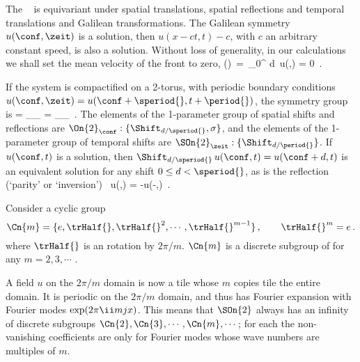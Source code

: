 


The \KSe\  is equivariant under spatial translations, spatial
reflections and temporal translations and Galilean transformations.
The Galilean symmetry $u(\conf,\zeit)$ is a solution,
then $u(x -ct,t) -c $, with $c$ an arbitrary constant
speed, is also a solution. Without loss of generality, in our
calculations we shall set the mean velocity of the front to zero,
\beq
{}(\zeit)
  \,=\, \int_0^{\speriod{}} d\conf \, u(\conf,\zeit) = 0
\,.

If the system is compactified on a
2-torus, with periodic boundary conditions
$u(\conf,\zeit)=u(\conf+\speriod{},t+\period{})$, the symmetry group is
\beq
\Group = _\conf \times {}_\zeit
        =  \ltimes {}_\conf \times {}_\zeit
\,.
The elements of the 1-parameter group of spatial shifts and reflections are
$\On{2}_\conf:\{\Shift_{\shift/\speriod{}},\Refl \}$, and
the elements of the 1-parameter group of temporal shifts are
$\SOn{2}_\zeit:\{\Shift_{\shift/\period{}}\}$.
If $u(\conf,t)$ is a solution, then $\Shift_{\shift/\speriod{}}\, u(\conf,t) =
u(\conf+\shift,t)$ is an equivalent solution for any shift $0 \leq \shift <
\speriod{}$, as is the reflection (`parity' or `inversion')
\beq
    \Refl \, u(\conf,\zeit) = -u(-\conf,\zeit)
\,.

Consider a cyclic group
\[
\Cn{m} = \{e,\trHalf{},\trHalf{}^{2},\cdots,\trHalf{}^{m-1}\}
\,,\qquad \trHalf{}^m= e
\,.
\]
where $\trHalf{}$ is an  rotation by $2\pi/m$. $\Cn{m}$
is a discrete subgroup of  for any $m=2,3,\cdots$ .

A field $u$ on the $2\pi/m$ domain is now a
tile whose $m$ copies tile the entire domain. It is periodic on the
$2\pi/m$ domain, and thus has Fourier expansion with Fourier modes
$\exp(2\pi\ii m j \ssp)$. This means that $\SOn{2}$ always has an
infinity of discrete subgroups $\Cn{2}, \Cn{3}, \cdots,\Cn{m}, \cdots$;
for each the non-vanishing coefficients are only for Fourier modes whose
wave numbers are multiples of $m$.

